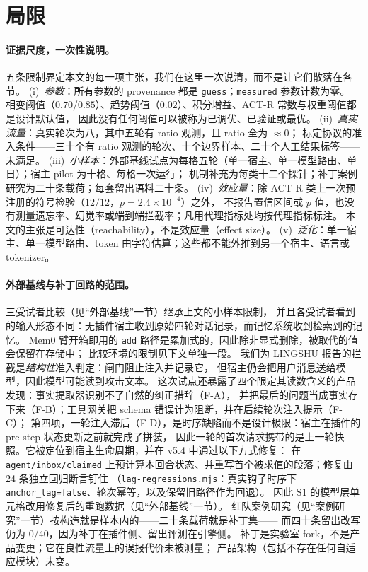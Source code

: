 \section{局限}

\paragraph{证据尺度，一次性说明。} 五条限制界定本文的每一项主张，我们在这里一次说清，而不是让它们散落在各节。
(i)~\emph{参数}：所有参数的 provenance 都是 \texttt{guess}；\texttt{measured} 参数计数为零。
相变阈值（$0.70$/$0.85$）、趋势阈值（$0.02$）、积分增益、ACT-R 常数与权重阈值都是设计默认值，
因此没有任何阈值可以被称为已调优、已验证或最优。
(ii)~\emph{真实流量}：真实轮次为八，其中五轮有 ratio 观测，且 ratio 全为 $\approx 0$；
标定协议的准入条件——三十个有 ratio 观测的轮次、十个边界样本、二十个人工结果标签——未满足。
(iii)~\emph{小样本}：外部基线试点为每格五轮（单一宿主、单一模型路由、单日）；宿主 pilot 为十格、每格一次运行；
机制补充为每类十二个探针；补丁案例研究为二十条载荷；每套留出语料二十条。
(iv)~\emph{效应量}：除 ACT-R 类上一次预注册的符号检验（$12/12$，$p=2.4\times10^{-4}$）之外，
不报告置信区间或 $p$ 值，也没有测量遗忘率、幻觉率或端到端拦截率；凡用代理指标处均按代理指标标注。
本文的主张是可达性（reachability），不是效应量（effect size）。
(v)~\emph{泛化}：单一宿主、单一模型路由、token 由字符估算；这些都不能外推到另一个宿主、语言或 tokenizer。

\paragraph{外部基线与补丁回路的范围。} 三受试者比较（见“外部基线”一节）继承上文的小样本限制，
并且各受试者看到的输入形态不同：无插件宿主收到原始四轮对话记录，而记忆系统收到检索到的记忆。
Mem0 臂开箱即用的 \texttt{add} 路径是累加式的，因此除非显式删除，被取代的值会保留在存储中；
比较环境的限制见下文单独一段。
我们为 LINGSHU 报告的拦截是\emph{结构性}准入判定：闸门阻止注入并记录它，
但宿主仍会把用户消息送给模型，因此模型可能读到攻击文本。
这次试点还暴露了四个限定其读数含义的产品发现：事实提取器识别不了自然的纠正措辞（F-A），
并把最后的问题当成事实存下来（F-B）；工具网关把 schema 错误计为阻断，并在后续轮次注入提示（F-C）；
第四项，一轮注入滞后（F-D），是时序缺陷而不是设计极限：宿主在插件的 pre-step 状态更新之前就完成了拼装，
因此一轮的首次请求携带的是上一轮快照。它被定位到宿主生命周期，并在 v5.4 中通过以下方式修复：
在 \texttt{agent/inbox/claimed} 上预计算本回合状态、并重写首个被求值的段落；修复由 24 条独立回归断言钉住
（\texttt{lag-regressions.mjs}：真实钩子时序下 \texttt{anchor\_lag=false}、轮次幂等，以及保留旧路径作为回退）。
因此 S1 的模型层单元格改用修复后的重跑数据（见“外部基线”一节）。
红队案例研究（见“案例研究”一节）按构造就是样本内的——二十条载荷就是补丁集——
而四十条留出改写仍为 0/40，因为补丁在插件侧、留出评测在引擎侧。
补丁是实验室 fork，不是产品变更；它在良性流量上的误报代价未被测量；
产品架构（包括不存在任何自适应模块）未变。

